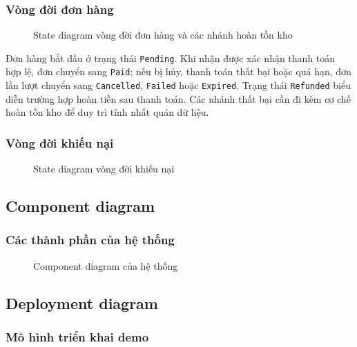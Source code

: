 \subsubsection{Vòng đời đơn hàng}

\begin{figure}[H]
\centering
{}
\caption{State diagram vòng đời đơn hàng và các nhánh hoàn tồn kho}
\end{figure}

Đơn hàng bắt đầu ở trạng thái \texttt{Pending}. Khi nhận được xác nhận thanh toán hợp lệ, đơn chuyển sang \texttt{Paid}; nếu bị hủy, thanh toán thất bại hoặc quá hạn, đơn lần lượt chuyển sang \texttt{Cancelled}, \texttt{Failed} hoặc \texttt{Expired}. Trạng thái \texttt{Refunded} biểu diễn trường hợp hoàn tiền sau thanh toán. Các nhánh thất bại cần đi kèm cơ chế hoàn tồn kho để duy trì tính nhất quán dữ liệu.

\subsubsection{Vòng đời khiếu nại}

\begin{figure}[H]
\centering
{}
\caption{State diagram vòng đời khiếu nại}
\end{figure}

\subsection{Component diagram}

\subsubsection{Các thành phần của hệ thống}

\begin{figure}[H]
\centering
{}
\caption{Component diagram của hệ thống}
\end{figure}

\subsection{Deployment diagram}

\subsubsection{Mô hình triển khai demo}

